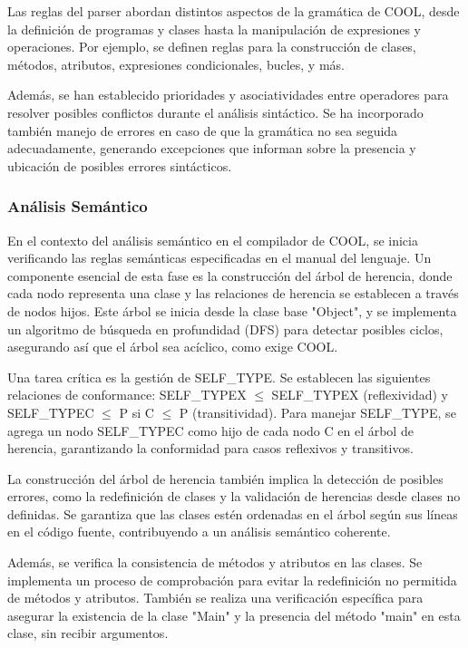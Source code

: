 \documentclass[10pt]{article} %
\begin{document}
	Las reglas del parser abordan distintos aspectos de la gramática de COOL, desde la definición de programas y clases hasta la manipulación de expresiones y operaciones. Por ejemplo, se definen reglas para la construcción de clases, métodos, atributos, expresiones condicionales, bucles, y más.
	
	Además, se han establecido prioridades y asociatividades entre operadores para resolver posibles conflictos durante el análisis sintáctico. Se ha incorporado también manejo de errores en caso de que la gramática no sea seguida adecuadamente, generando excepciones que informan sobre la presencia y ubicación de posibles errores sintácticos.
	
	\subsubsection{An\'alisis Sem\'antico}
	
	En el contexto del análisis semántico en el compilador de COOL, se inicia verificando las reglas semánticas especificadas en el manual del lenguaje. Un componente esencial de esta fase es la construcción del árbol de herencia, donde cada nodo representa una clase y las relaciones de herencia se establecen a través de nodos hijos. Este árbol se inicia desde la clase base "Object", y se implementa un algoritmo de búsqueda en profundidad (DFS) para detectar posibles ciclos, asegurando así que el árbol sea acíclico, como exige COOL.
	
	Una tarea crítica es la gestión de SELF\_TYPE. Se establecen las siguientes relaciones de conformance: SELF\_TYPEX $\leq$ SELF\_TYPEX (reflexividad) y SELF\_TYPEC $\leq$ P si C $\leq$ P (transitividad). Para manejar SELF\_TYPE, se agrega un nodo SELF\_TYPEC como hijo de cada nodo C en el árbol de herencia, garantizando la conformidad para casos reflexivos y transitivos.
	
	La construcción del árbol de herencia también implica la detección de posibles errores, como la redefinición de clases y la validación de herencias desde clases no definidas. Se garantiza que las clases estén ordenadas en el árbol según sus líneas en el código fuente, contribuyendo a un análisis semántico coherente.
	
	Además, se verifica la consistencia de métodos y atributos en las clases. Se implementa un proceso de comprobación para evitar la redefinición no permitida de métodos y atributos. También se realiza una verificación específica para asegurar la existencia de la clase "Main" y la presencia del método "main" en esta clase, sin recibir argumentos.
	
\end{document}
